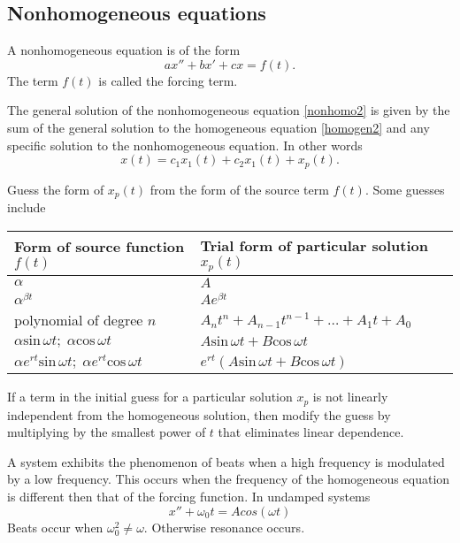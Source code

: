 \documentclass[nobib,notoc]{tufte-handout}
\begin{document}
\subsection{Nonhomogeneous equations}
\begin{defi}
	A nonhomogeneous equation is of the form
	\begin{equation*}
		\label{nonhomo2}
		ax''+bx'+cx=f(t).
	\end{equation*}
	The term \(f(t)\) is called the forcing term.
\end{defi}
\begin{thm}
	The general solution of the nonhomogeneous equation \ref{nonhomo2} is given by the sum of the general solution to the homogeneous equation \ref{homogen2} and any specific solution to the nonhomogeneous equation. In other words
	\begin{equation*}
		x(t)=c_1x_1(t)+c_2x_1(t)+x_p(t).
	\end{equation*}
\end{thm}
\begin{defi}
	Guess the form of \(x_p(t)\) from the form of the source term \(f(t)\). Some guesses include
	\bigbreak
	\begin{tabular}{l|l}
		Form of source function \(f(t)\)&Trial form of particular solution \(x_p(t)\)\\
		\hline
		\(\alpha\)&\(A\)\\
		\(\alpha^{\beta t}\)&\(Ae^{\beta t}\)\\
		polynomial of degree \(n\)&\(A_nt^n+A_{n-1}t^{n-1}+\ldots+A_1t+A_0\)\\
		\(\alpha\text{sin}\,\omega t;\;\alpha\text{cos}\,\omega t\)&\(A\text{sin}\,\omega t+B\text{cos}\,\omega t\)\\
		\(\alpha e^{rt}\text{sin}\,\omega t;\;\alpha e^{rt}\text{cos}\,\omega t\)& \(e^{rt}(A\text{sin}\,\omega t+B\text{cos}\,\omega t)\)\\
		\hline
	\end{tabular}
	\bigbreak
	If a term in the initial guess for a particular solution \(x_p\) is not linearly independent from the homogeneous solution, then modify the guess by multiplying by the smallest power of \(t\) that eliminates linear dependence.
\end{defi}
\begin{defi}[Beats]
	A system exhibits the phenomenon of beats when a high frequency is modulated by a low frequency. This occurs when the frequency of the homogeneous equation is different then that of the forcing function. In undamped systems
	\begin{equation*}
		x''+\omega_0 t=Acos(\omega t)
	\end{equation*}
	Beats occur when \(\omega_0^2\neq\omega\). Otherwise resonance occurs.
\end{defi}
\end{document}
